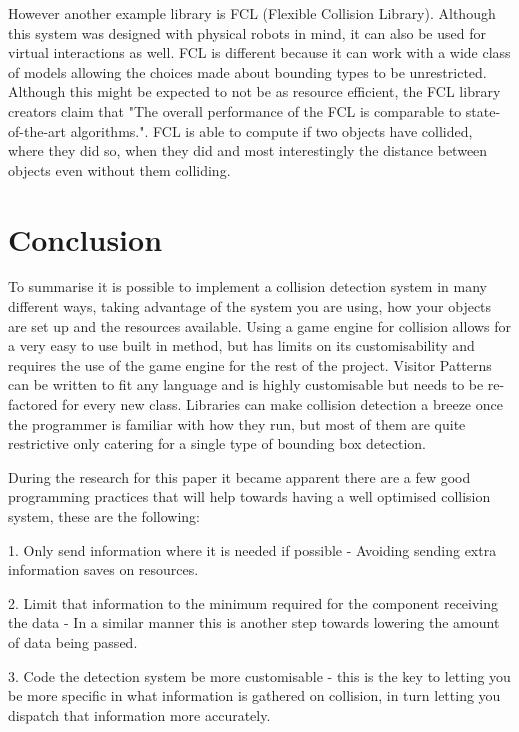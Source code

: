 \documentclass{scrartcl}
\begin{document}
	However another example library is FCL (Flexible Collision Library)\cite{pan2012fcl}. Although this system was designed with physical robots in mind, it can also be used for virtual interactions as well. FCL is different because it can work with a wide class of models allowing the choices made about bounding types to be unrestricted. Although this might be expected to not be as resource efficient, the FCL library creators claim that "The overall performance of the FCL is comparable to state-of-the-art algorithms."\cite{pan2012fcl}. FCL is able to compute if two objects have collided, where they did so, when they did and most interestingly the distance between objects even without them colliding.
	
	
	\section{Conclusion}
	
	To summarise it is possible to implement a collision detection system in many different ways, taking advantage of the system you are using, how your objects are set up and the resources available. Using a game engine for collision allows for a very easy to use built in method, but has limits on its customisability and requires the use of the game engine for the rest of the project. Visitor Patterns can be written to fit any language and is highly customisable but needs to be re-factored for every new class. Libraries can make collision detection a breeze once the programmer is familiar with how they run, but most of them are quite restrictive only catering for a single type of bounding box detection.
	
	During the research for this paper it became apparent there are a few good programming practices that will help towards having a well optimised collision system, these are the following: 
	
	1. Only send information where it is needed if possible - Avoiding sending extra information saves on resources.
	
	2. Limit that information to the minimum required for the component receiving the data - In a similar manner this is another step towards lowering the amount of data being passed.
	
	3. Code the detection system be more customisable - this is the key to letting you be more specific in what information is gathered on collision, in turn letting you dispatch that information more accurately.

	
	
	
	
	
\end{document}
